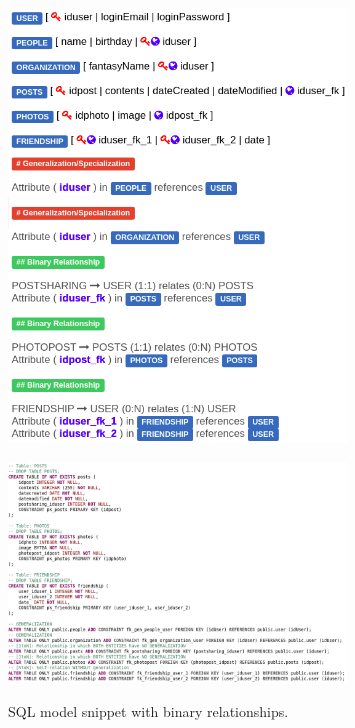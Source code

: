 \begin{figure}[!htb]
\begin{minipage}[b]{0.5\textwidth}
    \includegraphics[width=0.8\textwidth]{img/Logical_binary.png}
  \end{minipage}
\end{figure}

\begin{figure}[!htb]
    \centering
    \caption{SQL model snippet with binary relationships.}
    \includegraphics[width=0.8\textwidth]{img/SQL_Binary.png}
    \label{fig:SQL_Binary}
\end{figure}

